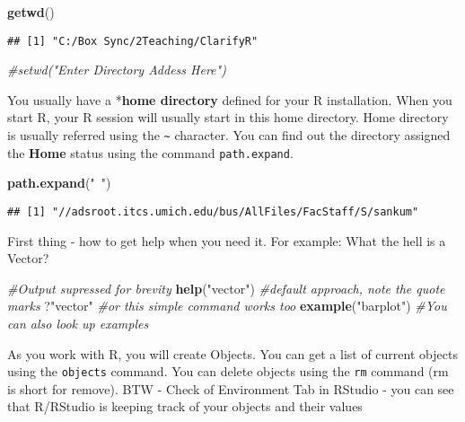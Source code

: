 \documentclass[
]{krantz}
\makeatletter
\newenvironment{Shaded}{\begin{snugshade}}{\end{snugshade}}
\newcommand{\CommentTok}[1]{\textcolor[rgb]{0.37,0.37,0.37}{\textit{#1}}}
\newcommand{\KeywordTok}[1]{\textcolor[rgb]{0.27,0.27,0.27}{\textbf{#1}}}
\newcommand{\NormalTok}[1]{#1}
\newcommand{\StringTok}[1]{\textcolor[rgb]{0.5,0.5,0.5}{#1}}
\newenvironment{kframe}{%
\medskip{}
\setlength{\fboxsep}{.8em}
 \def\at@end@of@kframe{}%
 \ifinner\ifhmode%
  \def\at@end@of@kframe{\end{minipage}}%
  \begin{minipage}{\columnwidth}%
 \fi\fi%
 \def\FrameCommand##1{\hskip\@totalleftmargin \hskip-\fboxsep
 \colorbox{shadecolor}{##1}\hskip-\fboxsep
     \hskip-\linewidth \hskip-\@totalleftmargin \hskip\columnwidth}%
 \MakeFramed {\advance\hsize-\width
   \@totalleftmargin\z@ \linewidth\hsize
   \@setminipage}}%
 {\par\unskip\endMakeFramed%
 \at@end@of@kframe}
\renewenvironment{Shaded}{\begin{kframe}}{\end{kframe}}
\makeatother
\begin{document}
\begin{Shaded}
\begin{Highlighting}[]
\KeywordTok{getwd}\NormalTok{()}
\end{Highlighting}
\end{Shaded}

\begin{verbatim}
## [1] "C:/Box Sync/2Teaching/ClarifyR"
\end{verbatim}

\begin{Shaded}
\begin{Highlighting}[]
\CommentTok{#setwd("Enter Directory Addess Here")}
\end{Highlighting}
\end{Shaded}

You usually have a *\textbf{home directory} defined for your R installation. When you start R, your R session will usually start in this home directory. Home directory is usually referred using the \texttt{\textasciitilde{}} character. You can find out the directory assigned the \textbf{Home} status using the command \texttt{path.expand}.

\begin{Shaded}
\begin{Highlighting}[]
\KeywordTok{path.expand}\NormalTok{(}\StringTok{"~"}\NormalTok{)}
\end{Highlighting}
\end{Shaded}

\begin{verbatim}
## [1] "//adsroot.itcs.umich.edu/bus/AllFiles/FacStaff/S/sankum"
\end{verbatim}

First thing - how to get help when you need it. For example: What the hell is a Vector?

\begin{Shaded}
\begin{Highlighting}[]
\CommentTok{#Output supressed for brevity}
\KeywordTok{help}\NormalTok{(}\StringTok{"vector"}\NormalTok{) }\CommentTok{#default approach, note the quote marks}
\NormalTok{?}\StringTok{"vector"} \CommentTok{#or this simple command works too}
\KeywordTok{example}\NormalTok{(}\StringTok{"barplot"}\NormalTok{) }\CommentTok{#You can also look up examples}
\end{Highlighting}
\end{Shaded}

As you work with R, you will create Objects. You can get a list of current objects using the \texttt{objects} command. You can delete objects using the \texttt{rm} command (rm is short for remove). BTW - Check of Environment Tab in RStudio - you can see that R/RStudio is keeping track of your objects and their values
\end{document}
